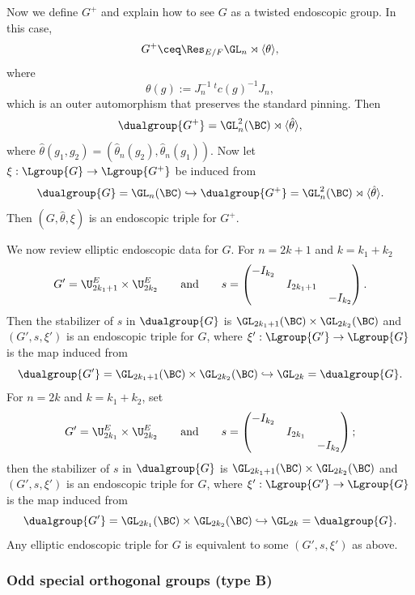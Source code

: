 \documentclass[11pt,letterpaper]{amsart}
\numberwithin{equation}{section}
\begin{document}
Now we define $G^+$ and explain how to see $G$ as a twisted endoscopic group.
In this case,
\[
G^+ \ceq \Res_{E/F}\GL_n \rtimes{\langle\theta\rangle},
\]
where  
\[
\theta(g):=J_n^{-1}\ {}^tc(g)^{-1}J_n,
\]
which is an outer automorphism that preserves the standard pinning. 
Then 
\[\dualgroup{G^+} =
\GL_n^2(\BC)\rtimes {\langle{\hat\theta}\rangle},
\]
where $\hat{\theta}(g_1,g_2)=(\hat{\theta}_n(g_2),\hat{\theta}_n(g_1)).$
Now let
$
\xi : \Lgroup{G} \to \Lgroup{G^+} 
$
be induced from 
\[
\dualgroup{G} 
= 
\GL_n(\BC)
\hookrightarrow
\dualgroup{G^+}
=
\GL_n^2(\BC) \rtimes{\langle{\hat\theta}\rangle}.
\]
Then $(G,{\hat\theta},\xi)$ is an endoscopic triple for $G^+$.

We now review elliptic endoscopic data for $G$.
For $n=2k+1$ and $k=k_1+k_2$ 
\begin{equation}\label{equation: s A odd}
G' = \U^{E}_{2k_1+1} \times \U^{E}_{2k_2}
\qquad\text{and}\qquad
s = \begin{pmatrix}
-I_{k_2} &&\\
&I_{2k_1+1}&\\
&&-I_{k_2}
\end{pmatrix}.
\end{equation}
Then the stabilizer of $s$ in $\dualgroup{G}$ is $\GL_{2k_1+1}(\BC) \times \GL_{2k_2}(\BC)$ and $(G',s,\xi')$ is an endoscopic triple for $G$, where $\xi' : \Lgroup{G'} \to \Lgroup{G}$ is the map induced from  
\[
\dualgroup{G'} = \GL_{2k_1+1}(\BC) \times \GL_{2k_2}(\BC) \hookrightarrow \GL_{2k} = \dualgroup{G}.
\]
For $n=2k$ and $k=k_1+k_2$, set 
\begin{equation}\label{equation: s A even}
G' = \U^{E}_{2k_1} \times \U^{E}_{2k_2}
\qquad\text{and}\qquad
s=\begin{pmatrix}
-I_{k_2}&&\\
&I_{2k_1}&\\
&&-I_{k_2}
\end{pmatrix};
\end{equation}
then the stabilizer of $s$ in $\dualgroup{G}$ is $\GL_{2k_1+1}(\BC) \times \GL_{2k_2}(\BC)$ and $(G',s,\xi')$ is an endoscopic triple for $G$, where $\xi' : \Lgroup{G'} \to \Lgroup{G}$ is the map induced from  
\[
\dualgroup{G'} = \GL_{2k_1}(\BC) \times \GL_{2k_2}(\BC) \hookrightarrow \GL_{2k} = \dualgroup{G}.
\]
Any elliptic endoscopic triple for $G$ is equivalent to some $(G',s,\xi')$ as above.

\subsubsection{Odd special orthogonal groups (type B)}
\label{subsubsection: B}
\end{document}
